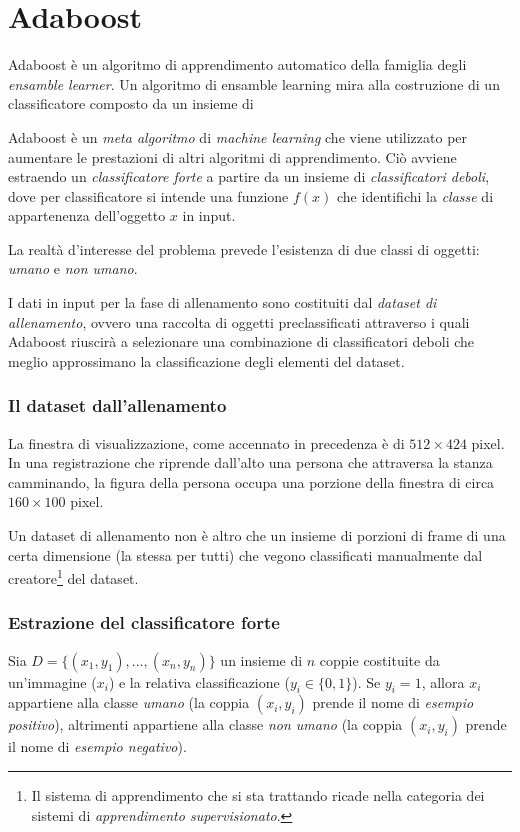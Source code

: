 
\chapter{Adaboost}
\label{cap:adaboost}
Adaboost è un algoritmo di apprendimento automatico della famiglia degli \emph{ensamble learner}. Un algoritmo di ensamble learning mira alla costruzione di un classificatore composto da un insieme di 


Adaboost è un \emph{meta algoritmo} di \emph{machine learning} che viene utilizzato per aumentare le prestazioni di altri algoritmi di apprendimento. Ciò avviene estraendo un \emph{classificatore forte} a partire da un insieme di \emph{classificatori deboli}, dove per classificatore si intende una funzione $f(x)$ che identifichi la \emph{classe} di appartenenza dell'oggetto $x$ in input.

La realtà d'interesse del problema prevede l'esistenza di due classi di oggetti: \emph{umano} e \emph{non umano}.

I dati in input per la fase di allenamento sono costituiti dal \emph{dataset di allenamento}, ovvero una raccolta di oggetti preclassificati attraverso i quali Adaboost riuscirà a selezionare una combinazione di classificatori deboli che meglio approssimano la classificazione degli elementi del dataset.

\subsection{Il dataset dall'allenamento} %
\label{sub:il_dataset_dall_allenamento}
La finestra di visualizzazione, come accennato in precedenza è di $512 \times 424$ pixel. In una registrazione che riprende dall'alto una persona che attraversa la stanza camminando, la figura della persona occupa una porzione della finestra di circa $160 \times 100$ pixel.

Un dataset di allenamento non è altro che un insieme di porzioni di frame di una certa dimensione (la stessa per tutti) che vegono classificati manualmente dal creatore\footnote{Il sistema di apprendimento che si sta trattando ricade nella categoria dei sistemi di \emph{apprendimento supervisionato}.} del dataset.


\subsection{Estrazione del classificatore forte} %
\label{sub:estrazione_del_classificatore_forte}
Sia $D = \{(x_1, y_1), ..., (x_n, y_n)\}$ un insieme di $n$ coppie costituite da un'immagine ($x_i$) e la relativa classificazione ($y_i \in \{ 0, 1 \}$). Se $y_i = 1$, allora $x_i$ appartiene alla classe \emph{umano} (la coppia $(x_i, y_i)$ prende il nome di \emph{esempio positivo}), altrimenti appartiene alla classe \emph{non umano} (la coppia $(x_i, y_i)$ prende il nome di \emph{esempio negativo}).

